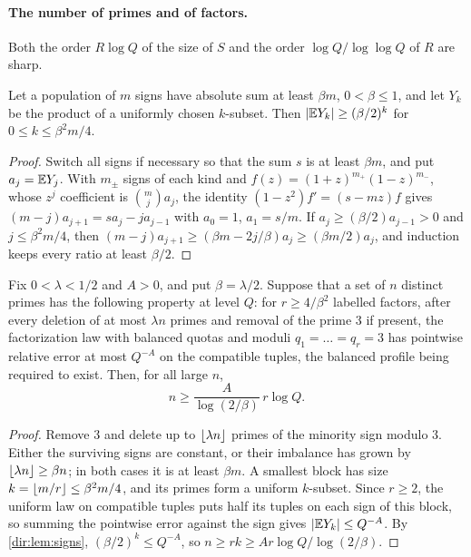 \paragraph{The number of primes and of factors.}
Both the order $R\log Q$ of the size of $S$ and the order $\log Q/\log\log Q$ of $R$ are
sharp.

\begin{lemma}\label{dir:lem:signs}
Let a population of $m$ signs have absolute sum at least $\beta m$, $0<\beta\le1$, and let $Y_k$
be the product of a uniformly chosen $k$-subset. Then $\lvert\mathbb{E} Y_k\rvert\ge(\beta/2)^k$ for
$0\le k\le\beta^2m/4$.
\end{lemma}

\begin{proof}
Switch all signs if necessary so that the sum $s$ is at least $\beta m$, and put $a_j=\mathbb{E} Y_j$.
With $m_\pm$ signs of each kind and $f(z)=(1+z)^{m_+}(1-z)^{m_-}$, whose $z^j$ coefficient is
$\binom mja_j$, the identity $(1-z^2)f'=(s-mz)f$ gives $(m-j)a_{j+1}=sa_j-ja_{j-1}$ with
$a_0=1$, $a_1=s/m$. If $a_j\ge(\beta/2)a_{j-1}>0$ and $j\le\beta^2m/4$, then
$(m-j)a_{j+1}\ge(\beta m-2j/\beta)a_j\ge(\beta m/2)a_j$, and induction keeps every ratio at least
$\beta/2$.
\end{proof}

\begin{theorem}\label{dir:thm:factorlower}
Fix $0<\lambda<1/2$ and $A>0$, and put $\beta=\lambda/2$. Suppose that a set of $n$ distinct
primes has the following property at level $Q$: for $r\ge4/\beta^2$ labelled factors, after
every deletion of at most $\lambda n$ primes and removal of the prime $3$ if present, the
factorization law with balanced quotas and moduli $q_1=\dots=q_r=3$ has pointwise relative error
at most $Q^{-A}$ on the compatible tuples, the balanced profile being required to exist. Then,
for all large $n$,
\[
 n\ge\frac A{\log(2/\beta)}\,r\log Q .
\]
\end{theorem}

\begin{proof}
Remove $3$ and delete up to $\lfloor\lambda n\rfloor$ primes of the minority sign modulo $3$. Either
the surviving signs are constant, or their imbalance has grown by $\lfloor\lambda n\rfloor\ge\beta n$;
in both cases it is at least $\beta m$. A smallest block has size $k=\lfloor m/r\rfloor\le\beta^2m/4$,
and its primes form a uniform $k$-subset. Since $r\ge2$, the uniform law on compatible tuples puts
half its tuples on each sign of this block, so summing the pointwise error against the sign gives
$\lvert\mathbb{E} Y_k\rvert\le Q^{-A}$. By \cref{dir:lem:signs}, $(\beta/2)^k\le Q^{-A}$, so
$n\ge rk\ge Ar\log Q/\log(2/\beta)$.
\end{proof}

